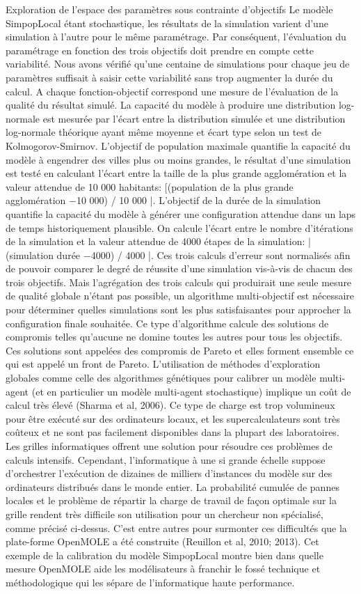 \documentclass[10pt]{article}
\begin{document}
Exploration de l’espace des paramètres sous contrainte d’objectifs
Le modèle SimpopLocal étant stochastique, les résultats de la simulation varient d'une simulation à l'autre pour le même paramétrage. Par conséquent, l'évaluation du paramétrage en fonction des trois objectifs doit prendre en compte cette variabilité. Nous avons vérifié qu’une centaine de simulations pour chaque jeu de paramètres suffisait à saisir cette variabilité sans trop augmenter la durée du calcul. 
A chaque fonction-objectif correspond une mesure de l’évaluation de la qualité du résultat simulé.  La capacité du modèle à produire une distribution log-normale est mesurée par l’écart entre la distribution simulée et une distribution log-normale théorique ayant même moyenne et écart type selon un test de Kolmogorov-Smirnov.  L’objectif de population maximale quantifie la capacité du modèle à engendrer des villes plus ou moins grandes, le résultat d'une simulation est testé en calculant l'écart entre la taille de la plus grande agglomération et la valeur attendue de 10 000 habitants: [(population de la plus grande agglomération −10 000) / 10 000 |. L’objectif de la durée de la simulation quantifie la capacité du modèle à générer une configuration attendue dans un laps de temps historiquement plausible. On calcule l’écart entre le nombre d’itérations de la simulation et la valeur attendue de 4000 étapes de la simulation: | (simulation durée −4000) / 4000 |. Ces trois calculs d’erreur sont normalisés afin de pouvoir comparer le degré de réussite d’une simulation vis-à-vis de chacun des trois objectifs. Mais l’agrégation des trois calculs qui produirait une seule mesure de qualité globale n’étant pas possible, un algorithme multi-objectif est nécessaire pour déterminer quelles simulations sont les plus satisfaisantes pour approcher la configuration finale souhaitée. Ce type d’algorithme calcule des solutions de compromis telles qu’aucune ne domine toutes les autres pour tous les objectifs. Ces solutions sont appelées des compromis de Pareto et elles forment ensemble ce qui est appelé un front de Pareto.
L’utilisation de méthodes d’exploration globales comme celle des algorithmes génétiques pour calibrer un modèle multi-agent (et en particulier un modèle multi-agent stochastique) implique un coût de calcul très élevé (Sharma et al, 2006). Ce type de charge est trop volumineux pour être exécuté sur des ordinateurs locaux, et les supercalculateurs sont très coûteux et ne sont pas facilement disponibles dans la plupart des laboratoires. Les grilles informatiques offrent une solution pour résoudre ces problèmes de calculs intensifs. Cependant, l’informatique à une si grande échelle suppose d’orchestrer l'exécution de dizaines de milliers d'instances du modèle sur des ordinateurs distribués dans le monde entier. La probabilité cumulée de pannes locales et le problème de répartir la charge de travail de façon optimale sur la grille rendent très difficile son utilisation pour un chercheur non spécialisé, comme précisé ci-dessus. C’est entre autres pour surmonter ces difficultés que la plate-forme OpenMOLE a été construite (Reuillon et al, 2010; 2013). Cet exemple de la calibration du modèle SimpopLocal montre bien dans quelle mesure OpenMOLE aide les modélisateurs à franchir le fossé technique et méthodologique qui les sépare de l'informatique haute performance.
\end{document}

